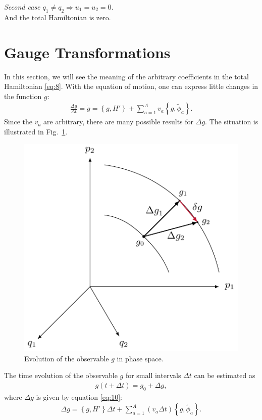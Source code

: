 \textit{Second case $q_1 \neq q_2 \Longrightarrow u_1 = u_2 = 0$.} \\
And the total Hamiltonian is zero.



\section{Gauge Transformations}
In this section, we will see the meaning of the arbitrary coefficients in the total Hamiltonian \eqref{eq:8}.
With the equation of motion, one can express little changes in the function $g$:
\begin{align}\label{eq:10}
\frac{\Delta g}{\Delta t} = \dot{g} = \left \{ g,H' \right \} + \sum_{a=1}^A v_a \left \{ g,\tilde{\phi}_a \right \}.
\end{align}
Since the $v_a$ are arbitrary, there are many possible results for $\Delta g$. The situation is illustrated in Fig.~\ref{fig:2}.

\begin{figure}[H]
\begin{center}
\includegraphics[scale=1.4]{img/gauge1.pdf}
\end{center}
\caption{Evolution of the observable $g$ in phase space.}
\label{fig:2}
\end{figure}

The time evolution of the observable $g$ for small intervals $\Delta t$ can be estimated as
\begin{align}
g(t + \Delta t) = g_0 + \Delta g,
\end{align}
where $\Delta g$ is given by equation \eqref{eq:10}:
\begin{align}
\Delta g = \left \{ g,H' \right \} \Delta t + \sum_{a=1}^A \left( v_a \Delta t \right) \left \{ g,\tilde{\phi}_a \right \}.
\end{align}

